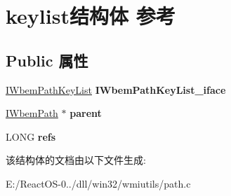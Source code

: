 \hypertarget{structkeylist}{}\section{keylist结构体 参考}
\label{structkeylist}
\subsection*{Public 属性}
\begin{DoxyCompactItemize}
\item 
\mbox{\label{structkeylist_acfb0c1bc219715454d06b02a22e50dde}} 
\hyperlink{interface_i_wbem_path_key_list}{I\+Wbem\+Path\+Key\+List} {\bfseries I\+Wbem\+Path\+Key\+List\+\_\+iface}
\item 
\mbox{\label{structkeylist_ad999ac4ba827d2a65f6c52da4bcdd5e5}} 
\hyperlink{interface_i_wbem_path}{I\+Wbem\+Path} $\ast$ {\bfseries parent}
\item 
\mbox{\label{structkeylist_ae07778778d65992ee2d8c67167dbdbca}} 
L\+O\+NG {\bfseries refs}
\end{DoxyCompactItemize}


该结构体的文档由以下文件生成\+:\begin{DoxyCompactItemize}
\item 
E\+:/\+React\+O\+S-\/0../dll/win32/wmiutils/path.\+c\end{DoxyCompactItemize}
